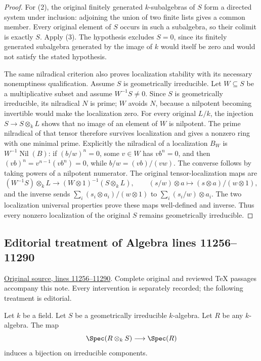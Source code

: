 \begin{proof}
For (2), the original finitely
generated $k$-subalgebras of $S$
form a directed system under
inclusion: adjoining the union
of two finite lists gives a
common member. Every original
element of $S$ occurs in such
a subalgebra, so their colimit
is exactly $S$. Apply (3).
The hypothesis excludes $S=0$,
since its finitely generated
subalgebra generated by the
image of $k$ would itself be
zero and would not satisfy
the stated hypothesis.

The same nilradical criterion
also proves localization
stability with its necessary
nonemptiness qualification.
Assume $S$ is geometrically irreducible.
Let $W\subseteq S$ be a
multiplicative subset and
assume $W^{-1}S\neq0$.
Since $S$ is geometrically
irreducible, its nilradical
$N$ is prime; $W$ avoids $N$,
because a nilpotent becoming
invertible would make the
localization zero. For every
original $L/k$, the injection
$S\to S\otimes_k L$ shows
that no image of an element
of $W$ is nilpotent. The
prime nilradical of that
tensor therefore survives
localization and gives a
nonzero ring with one minimal
prime. Explicitly the nilradical
of a localization $B_W$ is
$W^{-1}\operatorname{Nil}(B)$:
if $(b/w)^n=0$, some $v\in W$
has $v b^n=0$, and then
$(vb)^n=v^{n-1}(v b^n)=0$,
while $b/w=(vb)/(vw)$.
The converse follows by taking
powers of a nilpotent numerator.
The original tensor-localization
maps are
$$
(W^{-1}S)\otimes_k L
\longrightarrow (W\otimes1)^{-1}(S\otimes_k L),
\qquad(s/w)\otimes a\longmapsto(s\otimes a)/(w\otimes1),
$$
and the inverse sends
$\sum_i(s_i\otimes a_i)/(w\otimes1)$
to $\sum_i(s_i/w)\otimes a_i$.
The two localization universal
properties prove these maps
well-defined and inverse.
Thus every nonzero localization
of the original $S$ remains
geometrically irreducible.
\end{proof}


\subsection{Editorial treatment of Algebra lines 11256--11290}

\hypertarget{algebra-context-141}{}

\noindent\href{https://github.com/stacks/stacks-project/blob/a04446e57ec1fbc252a871afcec7752fb2807b14/algebra.tex\#L11256}{Original source, lines 11256--11290}. Complete original and reviewed TeX passages accompany this note. Every intervention is separately recorded; the following treatment is editorial.


\begin{lemma}
\label{editorial-source-lemma-geometrically-irreducible-any-base-change}
Let $k$ be a field.
Let $S$ be a geometrically irreducible $k$-algebra.
Let $R$ be any $k$-algebra.
The map
$$
\Spec(R \otimes_k S) \longrightarrow \Spec(R)
$$
induces a bijection on irreducible components.
\end{lemma}


